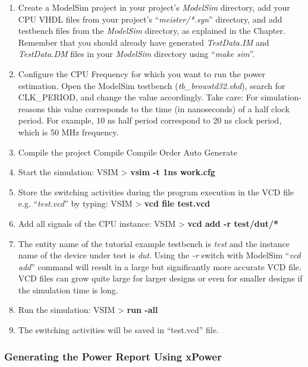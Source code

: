 \documentclass[
]{article}
\begin{document}
\begin{enumerate}
\def\labelenumi{(\arabic{enumi})}
\item
  Create a ModelSim project in your project's \emph{ModelSim} directory,
  add your CPU VHDL files from your project's ``\emph{meister/*.syn}''
  directory, and add testbench files from the \emph{ModelSim} directory,
  as explained in the Chapter. Remember that you should already have
  generated \emph{TestData.IM} and \emph{TestData.DM} files in your
  \emph{ModelSim} directory using ``\emph{make sim}''.
\item
  Configure the CPU Frequency for which you want to run the power
  estimation. Open the ModelSim testbench (\emph{tb\_browstd32.vhd}),
  search for CLK\_PERIOD, and change the value accordingly. Take care:
  For simulation-reasons this value corresponds to the time (in
  nanoseconds) of a half clock period. For example, 10 ns half period
  correspond to 20 ns clock period, which is 50 MHz frequency.
\item
  Compile the project Compile Compile Order Auto Generate
\item
  Start the simulation: VSIM \textgreater{} \textbf{vsim -t 1ns
  work.cfg}
\item
  Store the switching activities during the program execution in the VCD
  file e.g. ``\emph{test.vcd}'' by typing: VSIM \textgreater{}
  \textbf{vcd file test.vcd}
\item
  Add all signals of the CPU instance: VSIM \textgreater{} \textbf{vcd
  add -r test/dut/*}
\item
  The entity name of the tutorial example testbench is \emph{test} and
  the instance name of the device under test is \emph{dut}. Using the
  \emph{-r} switch with ModelSim ``\emph{vcd add}'' command will result
  in a large but significantly more accurate VCD file. VCD files can
  grow quite large for larger designs or even for smaller designs if the
  simulation time is long.
\item
  Run the simulation: VSIM \textgreater{} \textbf{run -all}
\item
  The switching activities will be saved in ``test.vcd'' file.
\end{enumerate}

\hypertarget{generating-the-power-report-using-xpower}{%
\subsubsection{Generating the Power Report Using
xPower}\label{generating-the-power-report-using-xpower}}
\end{document}
